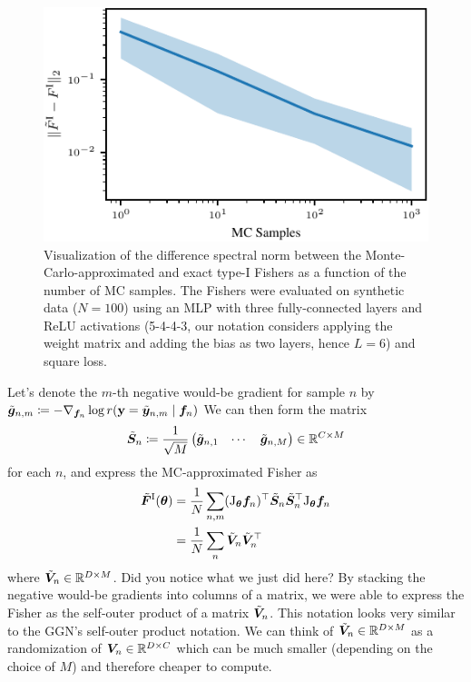 \begin{figure}
  \centering
  \includegraphics[width=\linewidth]{../kfs/plots/synthetic_rvec_diff_spec_norm.pdf}
  \caption{Visualization of the difference spectral norm between the Monte-Carlo-approximated and exact type-I Fishers as a function of the number of MC samples.
    The Fishers were evaluated on synthetic data ($N=100$) using an MLP with three fully-connected layers and ReLU activations (5-4-4-3, our notation considers applying the weight matrix and adding the bias as two layers, hence $L=6$) and square loss.
  }
\end{figure}

\switchcolumn[0]

Let's denote the $m$-th negative would-be gradient for sample $n$ by $\tilde{{\bm{g}}}_{n,m} \coloneq -\nabla_{{\bm{f}}_n} \log r({\mathbf{y}} = \tilde{{\bm{y}}}_{n,m} \mid {\bm{f}}_n)$
We can then form the matrix
\begin{align*}
  \tilde{{\bm{S}}}_n
  \coloneq
  \frac{1}{\sqrt{M}}
  \begin{pmatrix}
    \tilde{{\bm{g}}}_{n,1} & \cdots & \tilde{{\bm{g}}}_{n,M}
  \end{pmatrix}
  \in {\mathbb{R}}^{C \times M}
\end{align*}
for each $n$, and express the MC-approximated Fisher as
\begin{align*}
  \tilde{{\bm{F}}}^{\text{I}}({\bm{\theta}})
   & =
  \frac{1}{N} \sum_{n,m}
  (\mathrm{J}_{{\bm{\theta}}}{\bm{f}}_n)^{\top}
  \tilde{{\bm{S}}}_n
  \tilde{{\bm{S}}}_n^{\top}
  \mathrm{J}_{{\bm{\theta}}}{\bm{f}}_n
  \\
   & =
  \frac{1}{N} \sum_n
  \tilde{{\bm{V}}}_n
  \tilde{{\bm{V}}}_n^{\top}
\end{align*}
where $\tilde{{\bm{V}}}_n \in {\mathbb{R}}^{D \times M}$.
Did you notice what we just did here?
By stacking the negative would-be gradients into columns of a matrix, we were able to express the Fisher as the self-outer product of a matrix $\tilde{{\bm{V}}}_n$.
This notation looks very similar to the GGN's self-outer product notation.
We can think of $\tilde{{\bm{V}}}_n \in {\mathbb{R}}^{D \times M}$ as a randomization of ${\bm{V}}_n \in {\mathbb{R}}^{D \times C}$ which can be much smaller (depending on the choice of $M$) and therefore cheaper to compute.

